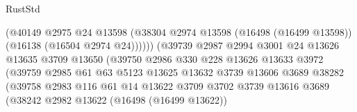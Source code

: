 \begin{lexlean}{RustStd}
\begin{coremodule}
                                          (@40149
                                            @2975
                                            @24
                                            @13598
                                            (@38304
                                              @2974
                                              @13598
                                              (@16498 (@16499 @13598))
                                              (@16138 (@16504 @2974 @24))))))
                                      (@39739
                                        @2987
                                        @2994
                                        @3001
                                        @24
                                        @13626
                                        @13635
                                        @3709
                                        @13650
                                        (@39750
                                          @2986
                                          @330
                                          @228
                                          @13626
                                          @13633
                                          @3972
                                          (@39759
                                            @2985
                                            @61
                                            @63
                                            @5123
                                            @13625
                                            @13632
                                            @3739
                                            @13606
                                            @3689
                                            @38282
                                            (@39758
                                              @2983
                                              @116
                                              @61
                                              @14
                                              @13622
                                              @3709
                                              @3702
                                              @3739
                                              @13616
                                              @3689
                                              (@38242
                                                @2982
                                                @13622
                                                (@16498 (@16499 @13622))

\end{coremodule}
\end{lexlean}
